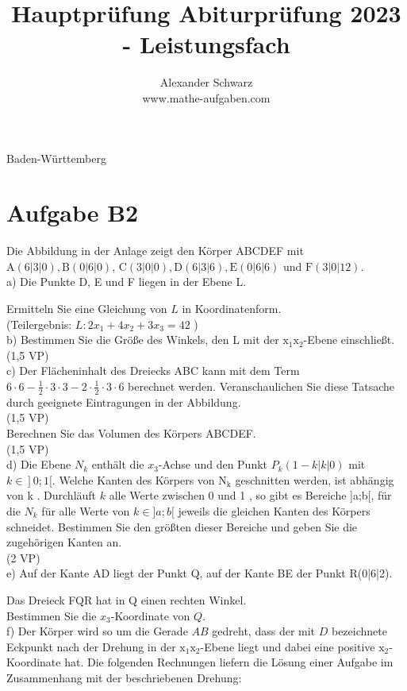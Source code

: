 \documentclass[10pt]{article}
\title{Hauptprüfung Abiturprüfung 2023 - Leistungsfach }
\author{Alexander Schwarz\\
www.mathe-aufgaben.com}
\date{}
\begin{document}
\maketitle
 Baden-Württemberg

\section*{Aufgabe B2}
Die Abbildung in der Anlage zeigt den Körper ABCDEF mit $\mathrm{A}(6|3| 0), \mathrm{B}(0|6| 0)$, $\mathrm{C}(3|0| 0), \mathrm{D}(6|3| 6), \mathrm{E}(0|6| 6)$ und $\mathrm{F}(3|0| 12)$.\\
a) Die Punkte D, E und F liegen in der Ebene L.

Ermitteln Sie eine Gleichung von $L$ in Koordinatenform.\\
(Teilergebnis: $L: 2 x_{1}+4 x_{2}+3 x_{3}=42$ )\\
b) Bestimmen Sie die Größe des Winkels, den L mit der $\mathrm{x}_{1} \mathrm{x}_{2}$-Ebene einschließt.\\
(1,5 VP)\\
c) Der Flächeninhalt des Dreiecks ABC kann mit dem Term $6 \cdot 6-\frac{1}{2} \cdot 3 \cdot 3-2 \cdot \frac{1}{2} \cdot 3 \cdot 6$ berechnet werden. Veranschaulichen Sie diese Tatsache durch geeignete Eintragungen in der Abbildung.\\
(1,5 VP)\\
Berechnen Sie das Volumen des Körpers ABCDEF.\\
(1,5 VP)\\
d) Die Ebene $N_{k}$ enthält die $x_{3}$-Achse und den Punkt $P_{k}(1-k|k| 0)$ mit $\left.k \in\right] 0 ; 1[$. Welche Kanten des Körpers von $\mathrm{N}_{\mathrm{k}}$ geschnitten werden, ist abhängig von k . Durchläuft $k$ alle Werte zwischen 0 und 1 , so gibt es Bereiche ]a;b[, für die $N_{k}$ für alle Werte von $k \in] a ; b[$ jeweils die gleichen Kanten des Körpers schneidet. Bestimmen Sie den größten dieser Bereiche und geben Sie die zugehörigen Kanten an.\\
(2 VP)\\
e) Auf der Kante AD liegt der Punkt Q, auf der Kante BE der Punkt R(0|6|2).

Das Dreieck FQR hat in Q einen rechten Winkel.\\
Bestimmen Sie die $x_{3}$-Koordinate von $Q$.\\
f) Der Körper wird so um die Gerade $A B$ gedreht, dass der mit $D$ bezeichnete Eckpunkt nach der Drehung in der $\mathrm{x}_{1} \mathrm{x}_{2}$-Ebene liegt und dabei eine positive $\mathrm{x}_{2}$-Koordinate hat. Die folgenden Rechnungen liefern die Lösung einer Aufgabe im Zusammenhang mit der beschriebenen Drehung:
\end{document}
